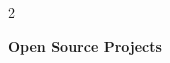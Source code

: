 \documentclass[10pt, letterpaper]{article}
\newenvironment{twocolentry}[2][]{
    \onecolentry
    \def\secondColumn{#2}
    \setcolumnwidth{\fill, 4.5 cm}
    \begin{paracol}{2}
}{
    \switchcolumn \raggedleft \secondColumn
    \end{paracol}
    \endonecolentry
} %
\begin{document}
%
%

\begin{twocolentry}{

    }
    \textbf{Open Source Projects}
\end{twocolentry}
\end{document}
